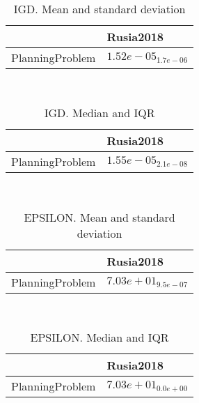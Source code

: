 \documentclass{article}
\begin{document}
\
\begin{table}
\caption{IGD. Mean and standard deviation}
\label{table:mean.IGD}
\centering
\begin{scriptsize}
\begin{tabular}{ll}
\hline &  Rusia2018\\
\hline
PlanningProblem & \cellcolor{gray95}$  1.52e-05_{ 1.7e-06}$ \\
\hline
\end{tabular}
\end{scriptsize}
\end{table}
\
\begin{table}
\caption{IGD. Median and IQR}
\label{table:median.IGD}
\begin{scriptsize}
\centering
\begin{tabular}{ll}
\hline &  Rusia2018\\
\hline
PlanningProblem & \cellcolor{gray95}$  1.55e-05_{ 2.1e-08}$ \\
\hline
\end{tabular}
\end{scriptsize}
\end{table}
\
\begin{table}
\caption{EPSILON. Mean and standard deviation}
\label{table:mean.EPSILON}
\centering
\begin{scriptsize}
\begin{tabular}{ll}
\hline &  Rusia2018\\
\hline
PlanningProblem & \cellcolor{gray95}$  7.03e+01_{ 9.5e-07}$ \\
\hline
\end{tabular}
\end{scriptsize}
\end{table}
\
\begin{table}
\caption{EPSILON. Median and IQR}
\label{table:median.EPSILON}
\begin{scriptsize}
\centering
\begin{tabular}{ll}
\hline &  Rusia2018\\
\hline
PlanningProblem & \cellcolor{gray95}$  7.03e+01_{ 0.0e+00}$ \\
\hline
\end{tabular}
\end{scriptsize}
\end{table}
\end{document}
